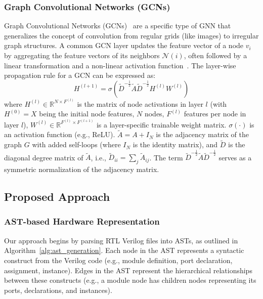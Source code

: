 \documentclass[sigplan,screen]{acmart}
\begin{document}
\subsubsection{Graph Convolutional Networks (GCNs)}
Graph Convolutional Networks (GCNs)~\cite{kipf2017semi} are a specific type of GNN that generalizes the concept of convolution from regular grids (like images) to irregular graph structures. A common GCN layer updates the feature vector of a node $v_i$ by aggregating the feature vectors of its neighbors $\mathcal{N}(i)$, often followed by a linear transformation and a non-linear activation function~\cite{hamilton2017inductive}. The layer-wise propagation rule for a GCN can be expressed as:
\begin{equation} \label{eq:gcn}
H^{(l+1)} = \sigma\left(\tilde{D}^{-\frac{1}{2}}\tilde{A}\tilde{D}^{-\frac{1}{2}}H^{(l)}W^{(l)}\right)
\end{equation}
where $H^{(l)} \in \mathbb{R}^{N \times F^{(l)}}$ is the matrix of node activations in layer $l$ (with $H^{(0)}=X$ being the initial node features, $N$ nodes, $F^{(l)}$ features per node in layer $l$), $W^{(l)} \in \mathbb{R}^{F^{(l)} \times F^{(l+1)}}$ is a layer-specific trainable weight matrix. $\sigma(\cdot)$ is an activation function (e.g., ReLU). $\tilde{A} = A + I_N$ is the adjacency matrix of the graph $G$ with added self-loops (where $I_N$ is the identity matrix), and $\tilde{D}$ is the diagonal degree matrix of $\tilde{A}$, i.e., $\tilde{D}_{ii} = \sum_j \tilde{A}_{ij}$. The term $\tilde{D}^{-\frac{1}{2}}\tilde{A}\tilde{D}^{-\frac{1}{2}}$ serves as a symmetric normalization of the adjacency matrix.

\subsection{Proposed Approach}
\subsubsection{AST-based Hardware Representation}
Our approach begins by parsing RTL Verilog files into ASTs, as outlined in Algorithm~\ref{alg:ast_generation}. Each node in the AST represents a syntactic construct from the Verilog code (e.g., module definition, port declaration, assignment, instance). Edges in the AST represent the hierarchical relationships between these constructs (e.g., a module node has children nodes representing its ports, declarations, and instances).
\end{document}
